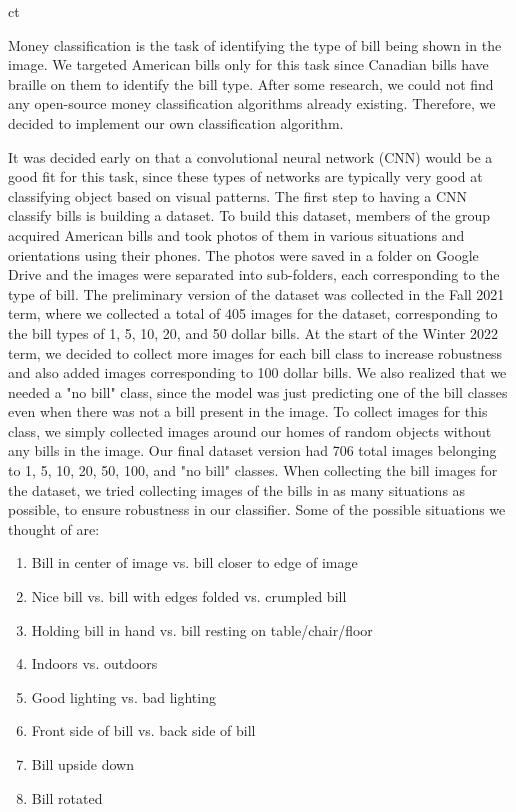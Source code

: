 ct\documentclass[a4paper,11pt]{article}
\begin{document}
Money classification is the task of identifying the type of bill being shown in the image. We targeted American bills only for this task since Canadian bills have braille on them to identify the bill type. After some research, we could not find any open-source money classification algorithms already existing. Therefore, we decided to implement our own classification algorithm.

It was decided early on that a convolutional neural network (CNN) would be a good fit for this task, since these types of networks are typically very good at classifying object based on visual patterns. The first step to having a CNN classify bills is building a dataset. To build this dataset, members of the group acquired American bills and took photos of them in various situations and orientations using their phones. The photos were saved in a folder on Google Drive and the images were separated into sub-folders, each corresponding to the type of bill. The preliminary version of the dataset was collected in the Fall 2021 term, where we collected a total of 405 images for the dataset, corresponding to the bill types of 1, 5, 10, 20, and 50 dollar bills. At the start of the Winter 2022 term, we decided to collect more images for each bill class to increase robustness and also added images corresponding to 100 dollar bills. We also realized that we needed a "no bill" class, since the model was just predicting one of the bill classes even when there was not a bill present in the image. To collect images for this class, we simply collected images around our homes of random objects without any bills in the image. Our final dataset version had 706 total images belonging to 1, 5, 10, 20, 50, 100, and "no bill" classes. When collecting the bill images for the dataset, we tried collecting images of the bills in as many situations as possible, to ensure robustness in our classifier. Some of the possible situations we thought of are:

\begin{enumerate}
    \item Bill in center of image vs. bill closer to edge of image
    \item Nice bill vs. bill with edges folded vs. crumpled bill
    \item Holding bill in hand vs. bill resting on table/chair/floor
    \item Indoors vs. outdoors
    \item Good lighting vs. bad lighting
    \item Front side of bill vs. back side of bill
    \item Bill upside down
    \item Bill rotated
\end{enumerate}
\end{document}
